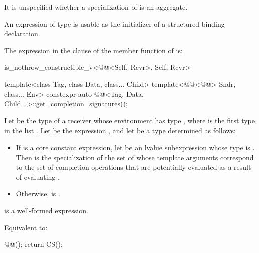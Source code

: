 \pnum
It is unspecified whether a specialization of 
is an aggregate.

\pnum
An expression of type  is usable as
the initializer of a structured binding declaration.

\pnum
The expression in the  clause of
the  member function of  is:
\begin{codeblock}
is_nothrow_constructible_v<@@<Self, Rcvr>, Self, Rcvr>
\end{codeblock}

%
\begin{itemdecl}
template<class Tag, class Data, class... Child>
  template<@@<@@> Sndr, class... Env>
    constexpr auto @@<Tag, Data, Child...>::get_completion_signatures();
\end{itemdecl}

\begin{itemdescr}
\pnum
Let  be the type of a receiver whose
environment has type , where
 is the first type in the list .
Let  be the expression
, and
let  be a type determined as follows:

\begin{itemize}
\item%
If  is a core constant expression,
let  be an lvalue subexpression
whose type is .
Then  is the specialization of 
the set of whose template arguments
correspond to the set of completion operations
that are potentially evaluated
as a result of evaluating .

\item%
Otherwise,  is .
\end{itemize}

\pnum
\constraints
{} is a well-formed expression.

\pnum
\effects
Equivalent to:
\begin{codeblock}
@@();
return CS();
\end{codeblock}
\end{itemdescr}

